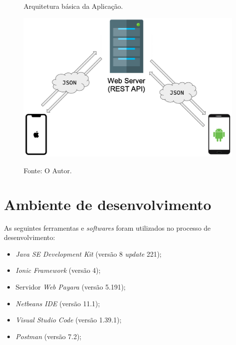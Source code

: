 \begin{figure}[H]
	\caption{Arquitetura básica da Aplicação.}
	\centering %
	\includegraphics[width=12cm]{resources/esquema_web_service.png} %
	\label{figura:arqu_basica}
	\captionsetup{singlelinecheck = false, format= hang, justification=raggedright, labelsep=space, width=12cm}
	\caption*{\footnotesize Fonte: O Autor.}
\end{figure}

\section{Ambiente de desenvolvimento}

As seguintes ferramentas e \textit{softwares} foram utilizados no processo de desenvolvimento:

\begin{itemize}
    \item \textit{Java SE Development Kit} (versão 8 \textit{update} 221);
    \item \textit{Ionic Framework} (versão 4);
    \item Servidor \textit{Web Payara} (versão 5.191);
    \item \textit{Netbeans IDE} (versão 11.1);
    \item \textit{Visual Studio Code} (versão 1.39.1);
    \item \textit{Postman} (versão 7.2);
\end{itemize}